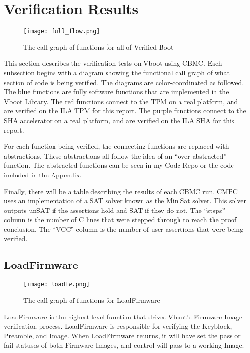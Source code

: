 \chapter{Verification Results}\label{sec:VerifResults}

\begin{figure}[!htbp]
  \centering
  \texttt{[image: full\_flow.png]}
  \caption[Vboot Full Call Graph]{The call graph of functions for all of Verified Boot}\label{fig:allflow}
\end{figure}

This section describes the verification tests on Vboot using CBMC\@.
Each subsection begins with a diagram showing the functional call graph of what section of code is being verified.
The diagrams are color-coordinated as followed.
The blue functions are fully software functions that are implemented in the Vboot Library.
The red functions connect to the TPM on a real platform, and are verified on the
ILA TPM for this report.
The purple functions connect to the SHA accelerator on a real platform, and 
are verified on the ILA SHA for this report.

For each function being verified, the connecting functions are replaced with
abstractions.
These abstractions all follow the idea of an ``over-abstracted'' function.
The abstracted functions can be seen in my Code Repo or the code included in the
Appendix.

Finally, there will be a table describing the results of each CBMC run.
CMBC uses an implementation of a SAT solver known as the MiniSat solver\cite{minisat}.
This solver outputs unSAT if the assertions hold and SAT if they do not. 
The ``steps'' column is the number of C lines that were stepped through to reach the proof conclusion.
The ``VCC'' column is the number of user assertions that were being verified.

\section{LoadFirmware}

\begin{figure}[!htbp]
  \centering
  \texttt{[image: loadfw.png]}
  \caption[LoadFirmware Call Graph]{The call graph of functions for LoadFirmware}\label{fig:loadfw}
\end{figure}

LoadFirmware is the highest level function that drives Vboot's Firmware Image
verification process.
LoadFirmware is responsible for verifying the Keyblock, Preamble, and Image.
When LoadFirmware returns, it will have set the pass or fail statuses of both Firmware Images, and control will pass to a working Image.

